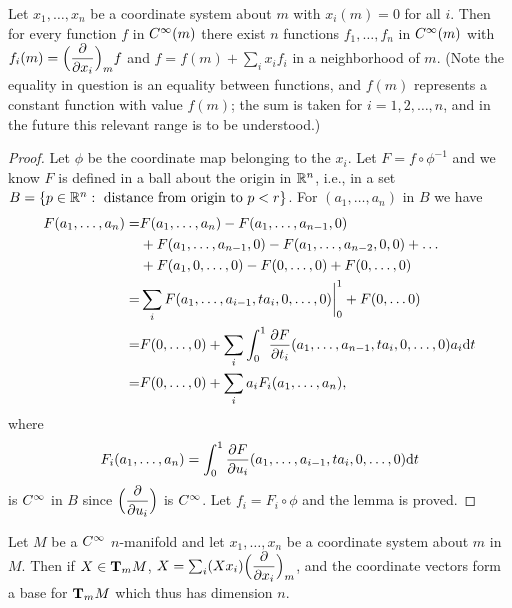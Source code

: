 \documentclass[../main]{subfiles}
\begin{document}
\begin{lemma} \label{lem:ch1.3.1}
Let $x_1, \dots, x_n$ be a coordinate system about $m$ with $x_i(m)=0$ for all $i$. Then for every function $f$ in $\CInfty(m)$ there exist $n$ functions $f_1, \dots, f_n$ in $\CInfty(m)$ with $f_i(m)=\Big(\pdv{}{x_i}\Big)_mf$ and $f=f(m)+\sum_i x_i f_i$ in a neighborhood of $m$. (Note the equality in question is an equality between functions, and $f(m)$ represents a constant function with value $f(m)$; the sum is taken for $i=1,2, \dots, n$, and in the future this relevant range is to be understood.)
\end{lemma}

\begin{proof}
Let $\phi$ be the coordinate map belonging to the $x_i$. Let $F=f\circ\phi^{-1}$ and we know $F$ is defined in a ball about the origin in $\bR^n$, i.e., in a set \newline $B=\{p\in\bR^n:\text{ distance from origin to }p<r\}$. For $(a_1,\dots,a_n)$ in $B$ we have
\begin{align*}
F(a_1, \dots, a_n)=&F(a_1, \dots, a_n)-F(a_1, \dots, a_{n-1}, 0)\\
&+F(a_1, \dots, a_{n-1}, 0)-F(a_1, \dots, a_{n-2}, 0,0)+\dots \\
&+F(a_1, 0, \dots, 0)-F(0, \dots, 0)+F(0, \dots, 0)\\
=&\sum_i F(a_1, \dots, a_{i-1}, ta_i, 0, \dots, 0)\bigg|_0^1+F(0, \dots 0) \\
=&F(0, \dots, 0)+\sum_i\int_0^1 \pdv{F}{t_i}(a_1, \dots, a_{n-1}, t a_i, 0, \dots, 0) a_i\dd t \\
=&F(0, \dots, 0)+\sum_i a_i F_i(a_1, \dots, a_n),
\end{align*}
where \[F_i(a_1, \dots, a_n)=\int_0^1\pdv{F}{u_i}(a_1, \dots, a_{i-1}, t a_i, 0, \dots, 0)\dd t\]
is $\CInfty$ in $B$ since $\Big(\pdv{}{u_i}\Big)$ is $\CInfty$. Let $f_i=F_i\circ\phi$ and the lemma is proved.
\end{proof}

\begin{theorem} \label{thm:ch1.3.2}
Let $M$ be a $\CInfty$ $n$-manifold and let $x_1, \dots, x_n$ be a coordinate system about $m$ in $M$. Then if $X \in \tangentspace{M}{m}$, $X=\sum_i(Xx_i)\Big(\pdv{}{x_i}\Big)_m$, and the coordinate vectors form a base for $\tangentspace{M}{m}$ which thus has dimension $n$.
\end{theorem}
\end{document}
